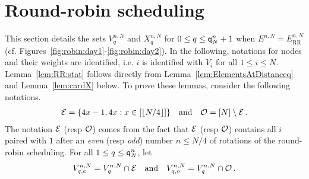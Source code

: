 \section{Round-robin scheduling}
\label{sec:round:robin}
This section details the sets $V_q^{n,N}$ and $X_q^{n,N}$ for $0\le q\le {\mathsf{q}}^{n}_{N}+1$ when $E^{n,N}=E^{n,N}_{\text{RR}}$ (cf. Figures~\ref{fig:robin:day1}-\ref{fig:robin:day2}). In the following, notations for nodes and their weights are identified, i.e. $i$ is identified with $V_i$ for all $1\le i \le N$. Lemma~\ref{lem:RR:stat} follows directly from Lemma~\ref{lem:ElementsAtDistanceq} and Lemma~\ref{lem:cardX} below. To prove these lemmas, consider the following notations.
\begin{gather*}
\mathcal{E}=\{4x-1,4x : x\in[\left\lfloor N/4\right\rfloor]\}\quad\mbox{and}\quad \mathcal{O}=[N]\setminus\mathcal{E}\,.
\end{gather*}
The notation $\mathcal{E}$ (resp $\mathcal{O}$) comes from the fact that $\mathcal{E}$ (resp $\mathcal{O}$) contains all $i$ paired with $1$ after an \emph{even} (resp \emph{odd}) number $n\le N/4$ of rotations of the round-robin scheduling. For all $1\le q\le {\mathsf{q}}^{n}_{N}$, let
\[
V_{q,e}^{n,N}= V_{q}^{n,N}\cap \mathcal{E}\quad\mbox{and}\quad V_{q,o}^{n,N}= V_{q}^{n,N}\cap \mathcal{O}\,.
\]


